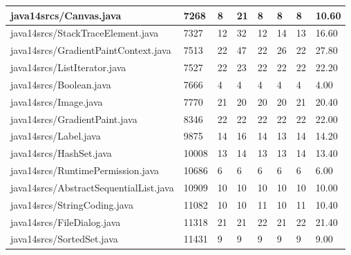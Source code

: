 \begin{tabular}{|l|l|l|l|l|l|l|l|}
\hline
java14srcs/Canvas.java                             & 7268        & 8         & 21        & 8         & 8         & 8         & 10.60     \\
\hline
java14srcs/StackTraceElement.java                  & 7327        & 12        & 32        & 12        & 14        & 13        & 16.60     \\
\hline
java14srcs/GradientPaintContext.java               & 7513        & 22        & 47        & 22        & 26        & 22        & 27.80     \\
\hline
java14srcs/ListIterator.java                       & 7527        & 22        & 23        & 22        & 22        & 22        & 22.20     \\
\hline
java14srcs/Boolean.java                            & 7666        & 4         & 4         & 4         & 4         & 4         & 4.00      \\
\hline
java14srcs/Image.java                              & 7770        & 21        & 20        & 20        & 20        & 21        & 20.40     \\
\hline
java14srcs/GradientPaint.java                      & 8346        & 22        & 22        & 22        & 22        & 22        & 22.00     \\
\hline
java14srcs/Label.java                              & 9875        & 14        & 16        & 14        & 13        & 14        & 14.20     \\
\hline
java14srcs/HashSet.java                            & 10008       & 13        & 14        & 13        & 13        & 14        & 13.40     \\
\hline
java14srcs/RuntimePermission.java                  & 10686       & 6         & 6         & 6         & 6         & 6         & 6.00      \\
\hline
java14srcs/AbstractSequentialList.java             & 10909       & 10        & 10        & 10        & 10        & 10        & 10.00     \\
\hline
java14srcs/StringCoding.java                       & 11082       & 10        & 10        & 11        & 10        & 11        & 10.40     \\
\hline
java14srcs/FileDialog.java                         & 11318       & 21        & 21        & 22        & 21        & 22        & 21.40     \\
\hline
java14srcs/SortedSet.java                          & 11431       & 9         & 9         & 9         & 9         & 9         & 9.00      \\

\end{tabular}
